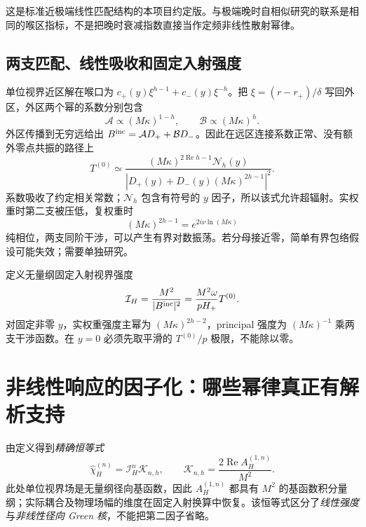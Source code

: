 \documentclass[UTF8,fontset=fandol,11pt,a4paper]{ctexart}
\newcommand{\Ree}{\operatorname{Re}}
\begin{document}
这是标准近极端线性匹配结构的本项目约定版\cite{BredbergKerrCFT2010}。与极端晚时自相似研究的联系是相同的喉区指标，不是把晚时衰减指数直接当作定频非线性散射幂律。

\subsection{两支匹配、线性吸收和固定入射强度}
单位视界近区解在喉口为 $c_+(y)\xi^{h-1}+c_-(y)\xi^{-h}$。把 $\xi=(r-r_+)/\delta$ 写回外区，外区两个幂的系数分别包含
\begin{equation}
 \mathcal A\propto(M\kappa)^{1-h},\qquad
 \mathcal B\propto(M\kappa)^h.
\end{equation}
外区传播到无穷远给出 $B^{\rm inc}=\mathcal A D_++\mathcal B D_-$。因此在远区连接系数正常、没有额外零点共振的路径上
\begin{equation}
 T^{(0)}\simeq
 \frac{(M\kappa)^{2\Ree h-1}\mathcal N_h(y)}
 {|D_+(y)+D_-(y)(M\kappa)^{2h-1}|^2}.
\label{eq:new-matched-t0}
\end{equation}
系数吸收了约定相关常数；$\mathcal N_h$ 包含有符号的 $y$ 因子，所以该式允许超辐射。实权重时第二支被压低，复权重时
\begin{equation}
 (M\kappa)^{2h-1}=e^{2i\nu\ln(M\kappa)}
\end{equation}
纯相位，两支同阶干涉，可以产生有界对数振荡。若分母接近零，简单有界包络假设可能失效；需要单独研究。

定义无量纲固定入射视界强度
\begin{equation}
 \mathcal I_H=\frac{M^2}{|B^{\rm inc}|^2}
 =\frac{M^2\omega}{pH_+}T^{(0)}.
\end{equation}
对固定非零 $y$，实权重强度主幂为 $(M\kappa)^{2h-2}$，principal 强度为 $(M\kappa)^{-1}$ 乘两支干涉函数。在 $y=0$ 必须先取平滑的 $T^{(0)}/p$ 极限，不能除以零。

\section{非线性响应的因子化：哪些幂律真正有解析支持}
由定义得到\emph{精确恒等式}
\begin{equation}
 \boxed{\widehat\chi_H^{(n)}=\mathcal I_H^n\mathcal K_{n,h},\qquad
 \mathcal K_{n,h}=\frac{2\Ree A_H^{(1,n)}}{M^2}.}
\label{eq:new-factorization}
\end{equation}
此处单位视界场是无量纲径向基函数，因此 $A_H^{(1,n)}$ 都具有 $M^2$ 的基函数积分量纲；实际耦合及物理场幅的维度在固定入射换算中恢复。该恒等式区分了\emph{线性强度}与\emph{非线性径向 Green 核}，不能把第二因子省略。
\end{document}
